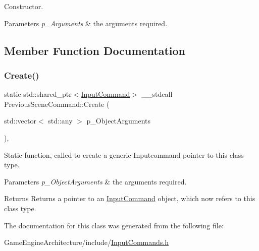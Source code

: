 Constructor. 


\begin{DoxyParams}{Parameters}
{\em p\+\_\+\+Arguments} & the arguments required. \\
\hline
\end{DoxyParams}


\subsection{Member Function Documentation}
\mbox{\label{class_previous_scene_command_a6019fd6d0a047b7a0d9ed9614faaf2f1}} 
\subsubsection{\texorpdfstring{Create()}{Create()}}
{\footnotesize\ttfamily static std\+::shared\+\_\+ptr$<$\mbox{\hyperlink{class_input_command}{Input\+Command}}$>$ \+\_\+\+\_\+stdcall Previous\+Scene\+Command\+::\+Create (\begin{DoxyParamCaption}\item[{std\+::vector$<$ std\+::any $>$}]{p\+\_\+\+Object\+Arguments }\end{DoxyParamCaption})\hspace{0.3cm}{\ttfamily [inline]}, {\ttfamily [static]}}



Static function, called to create a generic Inputcommand pointer to this class type. 


\begin{DoxyParams}{Parameters}
{\em p\+\_\+\+Object\+Arguments} & the arguments required. \\
\hline
\end{DoxyParams}
\begin{DoxyReturn}{Returns}
Returns a pointer to an \mbox{\hyperlink{class_input_command}{Input\+Command}} object, which now refers to this class type. 
\end{DoxyReturn}


The documentation for this class was generated from the following file\+:\begin{DoxyCompactItemize}
\item 
Game\+Engine\+Architecture/include/\mbox{\hyperlink{_input_commands_8h}{Input\+Commands.\+h}}\end{DoxyCompactItemize}
